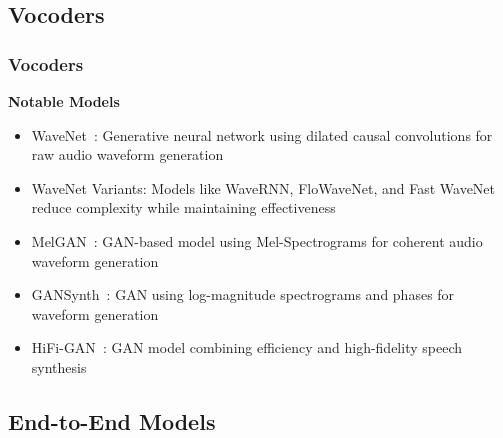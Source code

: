\subsection{Vocoders}

\begin{frame}
    \frametitle{Vocoders}

    \textbf{Notable Models}
    \begin{itemize}
        \item WaveNet~\cite{oord_wavenet_2016}: Generative neural network using dilated causal convolutions for raw audio waveform generation
        \item WaveNet Variants: Models like WaveRNN, FloWaveNet, and Fast WaveNet reduce complexity while maintaining effectiveness
        \item MelGAN~\cite{kumar_melgan_2019}: GAN-based model using Mel-Spectrograms for coherent audio waveform generation
        \item GANSynth~\cite{engel_gansynth_2019}: GAN using log-magnitude spectrograms and phases for waveform generation
        \item HiFi-GAN~\cite{kong_hifi-gan_2020}: GAN model combining efficiency and high-fidelity speech synthesis
    \end{itemize}
\end{frame}


\subsection{End-to-End Models}


